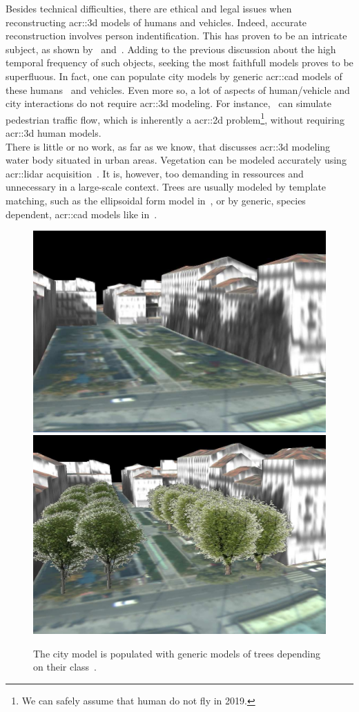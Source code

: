             Besides technical difficulties, there are ethical and legal issues when reconstructing \gls{acr::3d} models of humans and vehicles.
            Indeed, accurate reconstruction involves person indentification.
            This has proven to be an intricate subject, as shown by~\textcite{tavani2011ethics} and~\textcite{thornton2010individual}.
            Adding to the previous discussion about the high temporal frequency of such objects, seeking the most faithfull models proves to be superfluous.
            In fact, one can populate city models by generic \gls{acr::cad} models of these humans~\parencite{shao2007autonomous} and vehicles.
            Even more so, a lot of aspects of human/vehicle and city interactions do not require \gls{acr::3d} modeling.
            For instance,~\textcite{lovaas1994modeling} can simulate pedestrian traffic flow, which is inherently a \gls{acr::2d} problem\footnote{
                We can safely assume that human do not fly in 2019.
            }, without requiring \gls{acr::3d} human models.\\
            There is little or no work, as far as we know, that discusses \gls{acr::3d} modeling water body situated in urban areas.
            Vegetation can be modeled accurately using \gls{acr::lidar} acquisition~\parencite{omasa20063d}.
            It is, however, too demanding in ressources and unnecessary in a large-scale context.
            Trees are usually modeled by template matching, such as the ellipsoidal form model in~\textcite{lafarge2012creating}, or by generic, species dependent, \gls{acr::cad} models like in~\textcite{iovan2008detection}.\\
            \begin{figure}[htpb]
                \centering
                \includegraphics[width=.45\textwidth]{images/introduction/modeling_trees_1}
                \includegraphics[width=.45\textwidth]{images/introduction/modeling_trees_2}
                \caption{
                    \label{fig::3d_tree_models} The city model is populated with generic models of trees depending on their class~\parencite{iovan2008detection}.
                }
            \end{figure}
